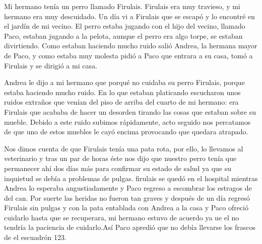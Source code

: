\documentclass{article}
\begin{document}
Mi hermano tenía un perro llamado Firulais. Firulais era muy travieso, y mi hermano era muy descuidado. Un día vi a Firulais que se escapó y lo encontré en el jardín de mi vecino.
El perro estaba jugando con el hijo del vecino, llamado Paco, estaban jugando a la pelota, aunque el perro era algo torpe, se estaban divirtiendo. Como estaban haciendo mucho ruido salió Andrea, la hermana mayor de Paco, y como estaba muy molesta pidió a Paco que entrara a su casa, tomó a Firulais y se dirigió a mi casa.

Andrea le dijo a mi hermano que porqué no cuidaba su perro Firulais, porque estaba haciendo mucho ruido. En lo que estaban platicando escucharon unos ruidos extraños que venían del piso de arriba del cuarto de mi hermano: era Firulais que acababa de hacer un desorden tirando las cosas que estaban sobre su mueble. Debido a este ruido subimos rápidamente, acto seguido nos percatamos de que uno de estos muebles le cayó encima provocando que quedara atrapado.

Nos dimos cuenta de que Firulais tenía una pata rota, por ello, lo llevamos al veterinario y tras un par de horas éste nos dijo que nuestro perro tenía que permanecer ahí dos días más para confirmar su estado de salud ya que su inquietud se debía a problemas de pulgas. firulais se quedó en el hospital mientras Andrea lo esperaba angustiadamente y Paco  regreso a escombrar los estragos de del can. 
Por suerte las heridas no fueron tan graves y después de un día regresó Firulais sin pulgas y con la pata entablada con Andrea a la casa y Paco ofreció cuidarlo hasta que se recuperara, mi hermano estuvo de acuerdo ya ue el no tendría la paciencia de cuidarlo.Así Paco apredió que no debía llevarse los frascos de el escuadrón 123.  
\end{document}
